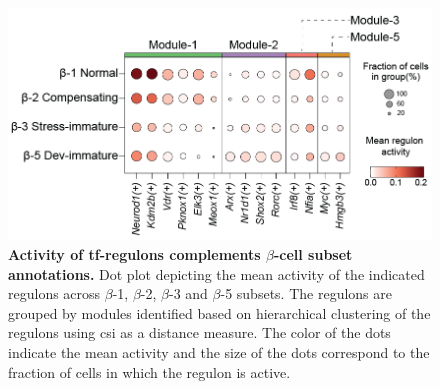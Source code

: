 \begin{figure}[t]
\centering
\includegraphics[width=12cm]{Chapter5/Fig/F3-12-v2-01.png}
\caption[Activity of -regulons complements $\beta$-cell subset annotations]{\textbf{Activity of \gls{tf}-regulons complements $\beta$-cell subset annotations.} Dot plot depicting the mean activity of the indicated regulons across $\beta$-1, $\beta$-2, $\beta$-3 and $\beta$-5 subsets. The regulons are grouped by modules identified based on hierarchical clustering of the regulons using \gls{csi} as a distance measure. The color of the dots indicate the mean activity and the size of the dots correspond to the fraction of cells in which the regulon is active.}
\label{fig:chp3_scenic_betasubsets}
\end{figure}



